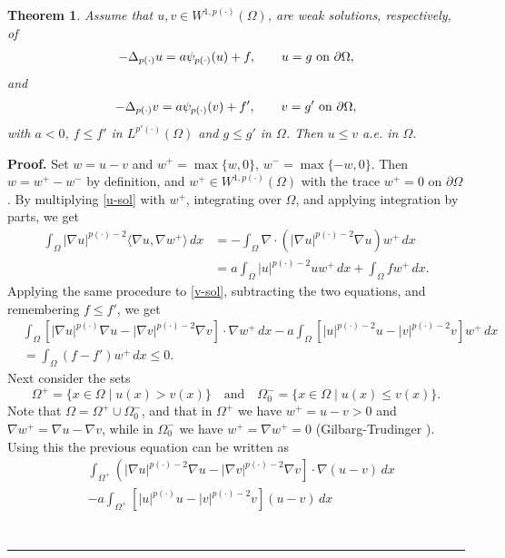 \documentclass[12pt]{article}
\newtheorem{theorem}{Theorem}
\newenvironment{proof}[1][Proof]{\textbf{#1.} }{\ \rule{0.5em}{0.5em}}
\numberwithin{komcounter}{section}
\begin{document}
\begin{theorem}
Assume that $u, v \in W^{1,p(\cdot)}(\Omega)$, are weak solutions, respectively, of
\begin{align}\label{u-sol}
-\Delta_{p(\cdot)} u = a\psi_{p(\cdot)}(u) + f, \qquad u = g \textrm{ on } \partial\Omega,
\end{align}
and
\begin{align}\label{v-sol}
-\Delta_{p(\cdot)} v = a\psi_{p(\cdot)}(v) + f', \qquad v = g' \textrm{ on } \partial\Omega,
\end{align}
with $a<0$, $f \leq f'$ in $L^{p'(\cdot)}(\Omega)$ and $g \leq g'$ in %
$\Omega$. Then $u \leq v$ a.e. in $\Omega$.
\end{theorem}

\noindent
\begin{proof}
Set $w = u - v$ and $w^+ = \max\{w,0\}$, $w^- = \max\{-w,0\}$. Then $w = w^+ - w^-$ by definition, and $w^+ \in W^{1,p(\cdot)}(\Omega)$ with the trace $w^+ = 0$ on $\partial\Omega$.
%
By multiplying \eqref{u-sol} with $w^+$, integrating over $\Omega$, and applying integration by parts, we get
\begin{align*}
\int_\Omega |\nabla u|^{p(\cdot)-2} \langle \nabla u, \nabla w^+\rangle \,dx &= -\int_\Omega \nabla\cdot( |\nabla u|^{p(\cdot)-2}\nabla u  )w^+\,dx \\ &= a \int_\Omega |u|^{p(\cdot)-2}u w^+\,dx + \int_\Omega fw^+\,dx.
\end{align*}
Applying the same procedure to \eqref{v-sol}, subtracting the two equations, and remembering $f \leq f'$, we get
\begin{align*}
& \int_\Omega \left[|\nabla u|^{p(\cdot)}\nabla u - |\nabla v|^{p(\cdot)-2}\nabla v \right]\cdot \nabla w^+\,dx - a \int_\Omega \left[|u|^{p(\cdot)-2}u - |v|^{p(\cdot)-2}v\right]w^+\,dx \\ &= \int_\Omega (f-f')w^+\,dx \leq 0.
\end{align*}
Next consider the sets
\[
\Omega^+ = \{ x \in \Omega \mid u(x) > v(x) \} \quad \text{and} \quad \Omega^-_0 = \{ x \in \Omega \mid u(x) \leq v(x) \}.
\]
Note that $\Omega = \Omega^+ \cup \Omega^-_0$, and that in $\Omega^+$ we have $w^+ = u-v > 0$ and $\nabla w^+ = \nabla u - \nabla v$, while in $\Omega^-_0$ we have $w^+ = \nabla w^+ = 0$ (Gilbarg-Trudinger \cite[Lemma 7.6]{GT}).
Using this the previous equation can be written as
\begin{align}\label{contra}
\nonumber & \int_{\Omega^+} \left(|\nabla u|^{p(\cdot)-2}\nabla u - |\nabla v|^{p(\cdot)-2}\nabla v\right]\cdot \nabla (u-v)\,dx \\& - a \int_{\Omega^+} \left[|u|^{p(\cdot)}u - |v|^{p(\cdot)-2}v\right](u-v)\,dx \\

\end{align}
\end{proof}
\end{document}
